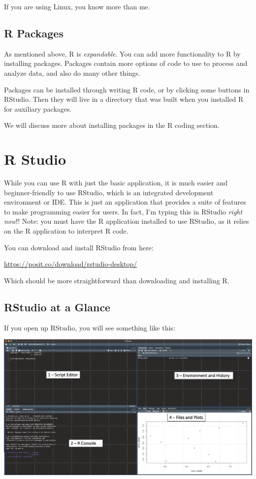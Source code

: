 \documentclass[
  letterpaper,
  DIV=11,
  numbers=noendperiod]{scrreprt}
\begin{document}
If you are using Linux, you know more than me.

\hypertarget{r-packages}{%
\section{R Packages}\label{r-packages}}

As mentioned above, R is \emph{expandable}. You can add more
functionality to R by installing packages. Packages contain more options
of code to use to process and analyze data, and also do many other
things.

Packages can be installed through writing R code, or by clicking some
buttons in RStudio. Then they will live in a directory that was built
when you installed R for auxiliary packages.

We will discuss more about installing packages in the R coding section.

\hypertarget{r-studio}{%
\chapter{R Studio}\label{r-studio}}

While you can use R with just the basic application, it is much easier
and beginner-friendly to use RStudio, which is an integrated development
environment or IDE. This is just an application that provides a suite of
features to make programming easier for users. In fact, I'm typing this
in RStudio \emph{right now}!! Note: you must have the R application
installed to use RStudio, as it relies on the R application to interpret
R code.

You can download and install RStudio from here:

\url{https://posit.co/download/rstudio-desktop/}

Which should be more straightforward than downloading and installing R.

\hypertarget{rstudio-at-a-glance}{%
\section{RStudio at a Glance}\label{rstudio-at-a-glance}}

If you open up RStudio, you will see something like this:

\includegraphics{rstudiowindow.png}
\end{document}
